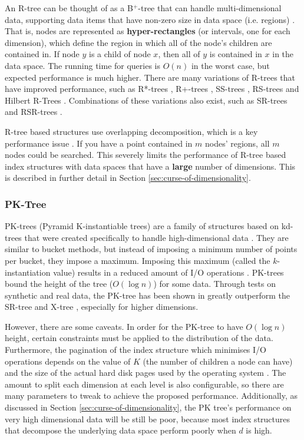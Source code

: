 An R-tree can be thought of as a B${}^{+}$-tree that can handle multi-dimensional data, supporting data items that have non-zero size in data space (i.e. regions) \cite{r-tree}. That is, nodes are represented as \textbf{hyper-rectangles} (or intervals, one for each dimension), which define the region in which all of the node's children are contained in. If node $y$ is a child of node $x$, then all of $y$ is contained in $x$ in the data space. The running time for queries is $O(n)$ in the worst case, but expected performance is much higher. There are many variations of R-trees that have improved performance, such as R*-trees \cite{rstar-tree}, R+-trees \cite{rplus-tree}, SS-trees \cite{ss-tree}, RS-trees \cite{rs-tree} and Hilbert R-Trees \cite{hilbert-rtree}. Combinations of these variations also exist, such as SR-trees \cite{md-structures-samet} and RSR-trees \cite{rsr-tree}.

R-tree based structures use overlapping decomposition, which is a key performance issue \cite{pyramid-tree}. If you have a point contained in $m$ nodes' regions, all $m$ nodes could be searched. This severely limits the performance of R-tree based index structures with data spaces that have a \textbf{large} number of dimensions. This is described in further detail in Section \ref{sec:curse-of-dimensionality}.

\subsubsection{PK-Tree}

PK-trees (Pyramid K-instantiable trees) are a family of structures based on kd-trees that were created specifically to handle high-dimensional data \cite{pk-tree}. They are similar to bucket methods, but instead of imposing a minimum number of points per bucket, they impose a maximum. Imposing this maximum (called the $k$-instantiation value) results in a reduced amount of I/O operations \cite{md-structures-samet}. PK-trees bound the height of the tree ($O(\log n)$) for some data. Through tests on synthetic and real data, the PK-tree has been shown in greatly outperform the SR-tree and X-tree \cite{pk-tree}, especially for higher dimensions.

However, there are some caveats. In order for the PK-tree to have $O(\log n)$ height, certain constraints must be applied to the distribution of the data. Furthermore, the pagination of the index structure which minimises I/O operations depends on the value of $K$ (the number of children a node can have) and the size of the actual hard disk pages used by the operating system \cite{pk-tree}. The amount to split each dimension at each level is also configurable, so there are many parameters to tweak to achieve the proposed performance. Additionally, as discussed in Section \ref{sec:curse-of-dimensionality}, the PK tree's performance on very high dimensional data will be still be poor, because most index structures that decompose the underlying data space perform poorly when $d$ is high.

